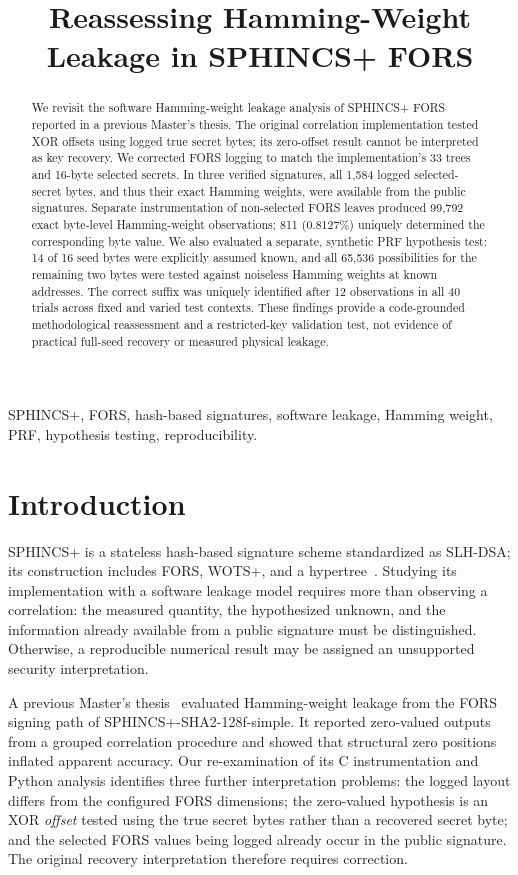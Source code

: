 \documentclass[conference,a4paper,10pt]{IEEEtran}
\title{Reassessing Hamming-Weight Leakage in SPHINCS+ FORS}
\author{\IEEEauthorblockN{Eya Frikha}\IEEEauthorblockA{University of Passau, Germany}}
\begin{document}
\maketitle
\begin{abstract}
We revisit the software Hamming-weight leakage analysis of SPHINCS+ FORS reported in a previous Master's thesis. The original correlation implementation tested XOR offsets using logged true secret bytes; its zero-offset result cannot be interpreted as key recovery. We corrected FORS logging to match the implementation's 33 trees and 16-byte selected secrets. In three verified signatures, all 1,584 logged selected-secret bytes, and thus their exact Hamming weights, were available from the public signatures. Separate instrumentation of non-selected FORS leaves produced 99,792 exact byte-level Hamming-weight observations; 811 (0.8127\%) uniquely determined the corresponding byte value. We also evaluated a separate, synthetic PRF hypothesis test: 14 of 16 seed bytes were explicitly assumed known, and all 65,536 possibilities for the remaining two bytes were tested against noiseless Hamming weights at known addresses. The correct suffix was uniquely identified after 12 observations in all 40 trials across fixed and varied test contexts. These findings provide a code-grounded methodological reassessment and a restricted-key validation test, not evidence of practical full-seed recovery or measured physical leakage.
\end{abstract}
\begin{IEEEkeywords}
SPHINCS+, FORS, hash-based signatures, software leakage, Hamming weight, PRF, hypothesis testing, reproducibility.
\end{IEEEkeywords}

\section{Introduction}
SPHINCS+ is a stateless hash-based signature scheme standardized as SLH-DSA; its construction includes FORS, WOTS+, and a hypertree~\cite{nist205,aumasson,bernstein}. Studying its implementation with a software leakage model requires more than observing a correlation: the measured quantity, the hypothesized unknown, and the information already available from a public signature must be distinguished. Otherwise, a reproducible numerical result may be assigned an unsupported security interpretation.

A previous Master's thesis~\cite{frikha2025} evaluated Hamming-weight leakage from the FORS signing path of SPHINCS+-SHA2-128f-simple. It reported zero-valued outputs from a grouped correlation procedure and showed that structural zero positions inflated apparent accuracy. Our re-examination of its C instrumentation and Python analysis identifies three further interpretation problems: the logged layout differs from the configured FORS dimensions; the zero-valued hypothesis is an XOR \emph{offset} tested using the true secret bytes rather than a recovered secret byte; and the selected FORS values being logged already occur in the public signature. The original recovery interpretation therefore requires correction.
\end{document}

